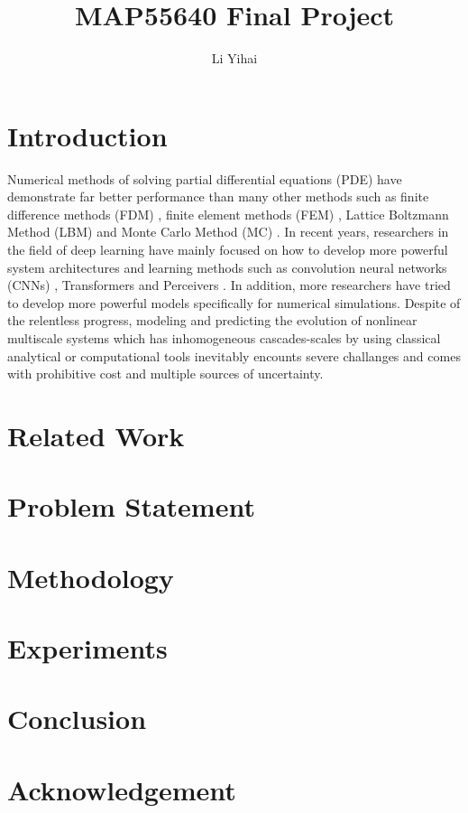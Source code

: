 \documentclass[manuscript, screen, review, language=english, natbib=false]{acmart}
\begin{document}
\title{MAP55640 Final Project}
\author{Li Yihai}



\begin{abstract}
\end{abstract}
    

\maketitle

\section{Introduction}
Numerical methods of solving partial differential equations (PDE) have 
demonstrate far better performance than many other methods such as finite 
difference methods (FDM) \cite{},
finite element methods (FEM) \cite{}, 
Lattice Boltzmann Method (LBM) \cite{}
and Monte Carlo Method (MC) \cite{}.
In recent years, researchers in the field of deep learning have mainly focused 
on how to develop more powerful system architectures and learning methods such 
as convolution neural networks (CNNs) \cite{}, 
Transformers \cite{} 
and Perceivers \cite{} .
In addition, more researchers have tried to develop more powerful models specifically 
for numerical simulations. 
Despite of the relentless progress, modeling and predicting the evolution of nonlinear 
multiscale systems which has inhomogeneous cascades-scales by using classical analytical 
or computational tools inevitably encounts severe challanges and comes with prohibitive
cost and multiple sources of uncertainty.


\section{Related Work}
\section{Problem Statement}
\section{Methodology}
\section{Experiments}
\section{Conclusion}
\section{Acknowledgement}


% 
% 
\printbibliography

\appendix
\end{document}
